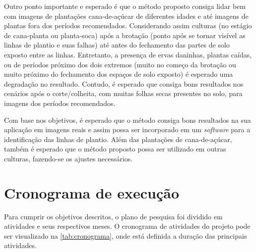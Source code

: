\documentclass[12pt, a4paper, english, brazil]{article}
\begin{document}
Outro ponto importante e esperado é que o método proposto consiga lidar bem com imagens de plantações cana-de-açúcar de diferentes idades e até imagens de plantas fora dos períodos recomendados. Considerando assim culturas (no estágio de cana-planta ou planta-soca) após a brotação (ponto após se tornar visível as linhas de plantio e suas falhas) até antes do fechamento das partes de solo exposto entre as linhas. Entretanto, a presença de ervas daninhas, plantas caídas, ou de períodos próximo dos dois extremos (muito no começo da brotação ou muito próximo do fechamento dos espaços de solo exposto) é esperado uma degradação no resultado. Contudo, é esperado que consiga bons resultados nos cenários após o corte/colheita, com muitas folhas secas presentes no solo, para imagens dos períodos recomendados.

Com base nos objetivos, é esperado que o método consiga bons resultados na sua aplicação em imagens reais e assim possa ser incorporado em um \textit{software} para a identificação das linhas de plantio. Além das plantações de cana-de-açúcar, também é esperado que o método proposto possa ser utilizado em outras culturas, fazendo-se os ajustes necessários.


\section{Cronograma de execução}

Para cumprir os objetivos descritos, o plano de pesquisa foi dividido em atividades e seus respectivos meses. O cronograma de atividades do projeto pode ser visualizado na \autoref{tab:cronograma}, onde está definida a duração das principais atividades.
\end{document}
